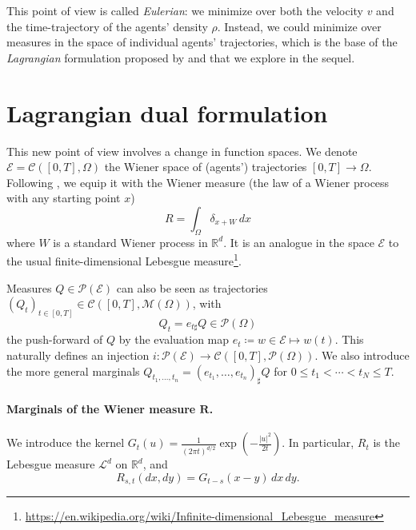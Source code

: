 \documentclass{article}
\newcommand{\RR}{\mathbb{R}}
\newcommand{\calC}{\mathcal{C}}
\newcommand{\calP}{\mathcal{P}}
\newcommand{\calM}{\mathcal{M}}
\begin{document}
	This point of view \cite{benamou:hal-01295299} is called \textit{Eulerian}: we minimize over both the velocity $v$ and the time-trajectory of the agents' density $\rho$. Instead, we could minimize over measures in the space of individual agents' trajectories, which is the base of the \textit{Lagrangian} formulation \cite{benamou2015lagrangian,benamou:hal-01295299} proposed by \citeauthor{benamou:hal-01295299} and that we explore in the sequel.


	\section{Lagrangian dual formulation}
    
    This new point of view involves a change in function spaces. We denote $\mathscr{E} = \calC([0,T], \Omega)$ the Wiener space of (agents') trajectories $[0,T] \rightarrow\Omega$. Following \cites{benamou:hal-01295299,benamou2015lagrangian}, we equip it with the Wiener measure (the law of a Wiener process with any starting point $x$)
    \[
    	R = \int_\Omega \delta_{x + W}\,dx
    \]
   	where $W$ is a standard Wiener process in $\RR^d$. It is an analogue in the space $\mathscr{E}$ to the usual finite-dimensional Lebesgue measure\footnote{\url{https://en.wikipedia.org/wiki/Infinite-dimensional_Lebesgue_measure}}.
   	
   	Measures $Q \in \calP(\mathscr{E})$ can also be seen as trajectories $(Q_t)_{t\in[0,T]} \in \calC([0,T], \calM(\Omega))$, with
    \[
    	Q_t = e_{t\sharp}Q \in \calP(\Omega)
    \]
    the push-forward of $Q$ by the evaluation map $e_t\coloneq w\in\mathscr{E}\longmapsto w(t)$. This naturally defines an injection $i\colon \calP(\mathscr{E}) \rightarrow \calC([0,T], \calP(\Omega))$. We also introduce the more general marginals $Q_{t_1,\ldots,t_n} = (e_{t_1},\ldots, e_{t_n})_\sharp Q$ for $0\leq t_1 < \cdots < t_N \leq T$.
    
    \paragraph{Marginals of the Wiener measure $\boldsymbol{R}$.} We introduce the kernel
    $G_t(u) =
    \frac{1}{(2\pi t)^{d/2}} \exp\left(-\frac{|u|^2}{2t}\right)$.
    In particular, $R_t$ is the Lebesgue measure $\mathcal{L}^d$ on $\RR^d$, and
    \begin{equation}\label{eq:2MarginWienerMeasure}
    	R_{s,t}(dx,dy) = G_{t-s}(x-y)\,dx\,dy.
    \end{equation}
    
\end{document}
